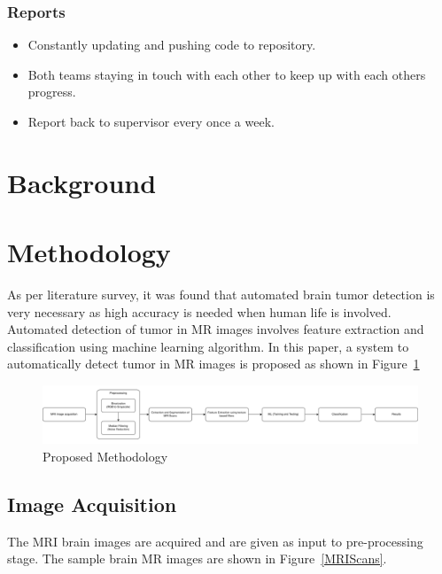 \documentclass[11pt]{article}
\begin{document}
	\subsubsection[reports]{Reports}
	\begin{itemize}
		\item Constantly updating and pushing code to repository.
		\item Both teams staying in touch with each other to keep up with each
			others progress.
		\item Report back to supervisor every once a week.
	\end{itemize}

	\section[background]{Background}
	

	\section[methodology]{Methodology}

	As per literature survey, it was found that automated  brain  tumor
	detection  is  very  necessary  as  high accuracy is needed when human life
	is involved.  Automated detection of tumor in MR images involves feature
	extraction and  classification  using  machine  learning  algorithm.  In
	this paper, a system to automatically detect tumor in MR images is proposed
	as shown in Figure~\ref{Proposed Methodology}

	\begin{figure}[h]
		\centering
		\includegraphics[width=1\linewidth]{imgs/methodology}
		\caption{Proposed Methodology}%
		\label{Proposed Methodology}
	\end{figure}

	\subsection{Image Acquisition}%
	\label{sub:Image Acquisition}

	The MRI brain images are acquired and are
	given as input to pre-processing stage. The sample brain MR images are shown
	in Figure~\ref{MRIScans}.
\end{document}
